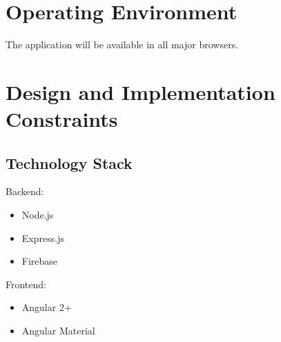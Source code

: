 \documentclass{scrreprt}
\begin{document}


\section{Operating Environment}
The application will be available in all major browsers.

\section{Design and Implementation Constraints}
\subsection{Technology Stack}
Backend:
\begin{itemize}
    \item Node.js
    \item Express.js
    \item Firebase
\end{itemize}
Frontend:
\begin{itemize}
    \item Angular 2+
    \item Angular Material
\end{itemize}
\newpage
\end{document}
